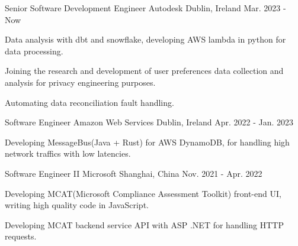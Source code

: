 

\begin{cventries}

\cventry
    {Senior Software Development Engineer} %
    {Autodesk} %
    {Dublin, Ireland} %
    {Mar. 2023 - Now} %
    {
      \begin{cvitems} %
        \item {Data analysis with dbt and snowflake, developing AWS lambda in python for data processing.}
        \item {Joining the research and development of user preferences data collection and analysis for privacy engineering purposes.}
        \item {Automating data reconciliation fault handling.}
      \end{cvitems}
    }

\cventry
    {Software Engineer} %
    {Amazon Web Services} %
    {Dublin, Ireland} %
    {Apr. 2022 - Jan. 2023} %
    {
      \begin{cvitems} %
        \item {Developing MessageBus(Java + Rust) for AWS DynamoDB, for handling high network traffics with low latencies.}
      \end{cvitems}
    }

\cventry
    {Software Engineer II} %
    {Microsoft} %
    {Shanghai, China} %
    {Nov. 2021 - Apr. 2022} %
    {
      \begin{cvitems} %
        \item {Developing MCAT(Microsoft Compliance Assessment Toolkit) front-end UI, writing high quality code in JavaScript.}
        \item {Developing MCAT backend service API with ASP .NET for handling HTTP requests.}
      \end{cvitems}
    }



\end{cventries}
